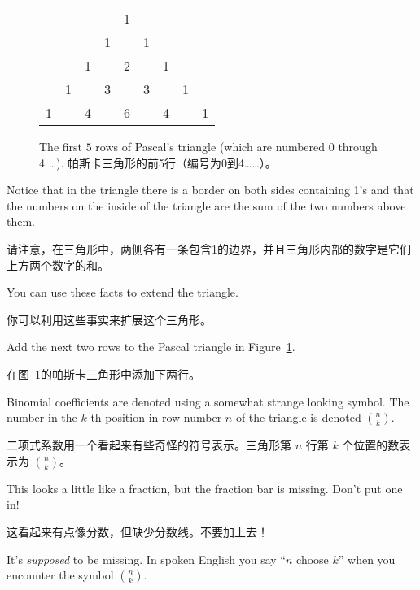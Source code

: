 \begin{figure}[!hbt]
\begin{center}
\begin{tabular}{ccccccccc}
 & & & & 1 & & & & \\
 & & & 1 & & 1 & & & \\
 & & 1 &  & 2 &  
 & 1 & & \\ 
 & 1 & & 3 & & 3 & & 1 & \\
1 & & 4 & & 6 & & 4 & & 1 \\
\end{tabular}
\end{center}

\vspace{.2in}

\caption[Pascal's triangle.帕斯卡三角形]{The first $5$ rows of Pascal's triangle (which are numbered 0 through 4 \ldots). 帕斯卡三角形的前5行（编号为0到4……）。}
\label{fig:pascal}
\end{figure}

Notice that in the triangle there is a border on both sides containing
1's and that the numbers on the inside of the triangle are the sum of the
two numbers above them.

请注意，在三角形中，两侧各有一条包含1的边界，并且三角形内部的数字是它们上方两个数字的和。

You can use these facts to extend the triangle.

你可以利用这些事实来扩展这个三角形。

\begin{exer}
Add the next two rows to the Pascal triangle in Figure~\ref{fig:pascal}.
\end{exer}

\begin{exer}
在图~\ref{fig:pascal}的帕斯卡三角形中添加下两行。
\end{exer}

Binomial coefficients are denoted using a somewhat strange looking
symbol.  The number in the $k$-th position in row number $n$ of
the triangle is denoted $\displaystyle \binom{n}{k}$.

二项式系数用一个看起来有些奇怪的符号表示。三角形第 $n$ 行第 $k$ 个位置的数表示为 $\displaystyle \binom{n}{k}$。

This looks 
a little like a fraction, but the fraction bar is missing.  Don't
put one in!

这看起来有点像分数，但缺少分数线。不要加上去！

It's \emph{supposed} to be missing.  In spoken English
you say ``$n$ choose $k$'' when you encounter the symbol $\displaystyle \binom{n}{k}$.

